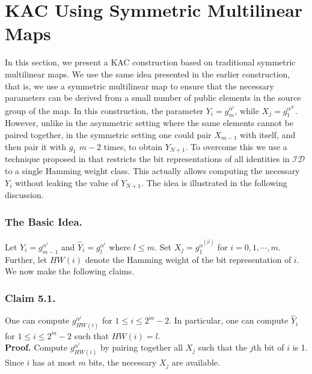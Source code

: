 \section{KAC Using Symmetric Multilinear Maps}
\label{sec:proposal2}

In this section, we present a KAC construction based on traditional symmetric multilinear maps. We use the same idea presented in the earlier construction, that is, we use a symmetric multilinear map to ensure that the necessary parameters can be derived from a small number of public elements in the source group of the map. In this construction, the parameter $Y_i=g^{\alpha^i}_m$, while $X_j=g^{\alpha^{2^j}}_1$. However, unlike in the asymmetric setting where the same elements cannot be paired together, in the symmetric setting one could pair $X_{m-1}$ with itself, and then pair it with $g_1$ $m-2$ times, to obtain $Y_{N+1}$. To overcome this we use a technique proposed in \cite{boneh2014low} that restricts the bit representations of all identities in $\mathcal{ID}$ to a single Hamming weight class. This actually allows computing the necessary $Y_i$ without leaking the value of $Y_{N+1}$. The idea is illustrated in the following discussion.

\subsubsection{The Basic Idea.} Let $Y_i=g^{\alpha^i}_{m-1}$ and $\hat{Y}_i=g^{\alpha^i}_l$ where $l\leq m$. Set $X_j=g^{\alpha^{(2^j)}}_1$ for $i=0,1,\cdots,m$. Further, let $HW(i)$ denote the Hamming weight of the bit representation of $i$. We now make the following claims.

\subsubsection{Claim 5.1.} One can compute $g^{\alpha^i}_{HW(i)}$ for $1\leq i\leq 2^m-2$. In particular, one can compute $\hat{Y}_i$ for $1\leq i\leq 2^m-2$ such that $HW(i)=l$.\\

\noindent\textbf{Proof.} Compute $g^{\alpha^i}_{HW(i)}$ by pairing together all $X_j$ such that the $j$th bit of $i$ is 1. Since $i$ has at most $m$ bits, the necessary $X_j$ are available. 

% 

